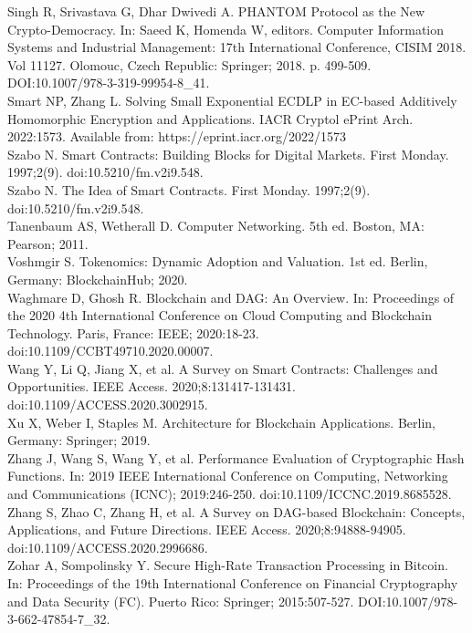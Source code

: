 \documentclass[10pt,a4paper,twocolumn]{article}
\begin{document}
Singh R, Srivastava G, Dhar Dwivedi A. PHANTOM Protocol as the New Crypto-Democracy. In: Saeed K, Homenda W, editors. Computer Information Systems and Industrial Management: 17th International Conference, CISIM 2018. Vol 11127. Olomouc, Czech Republic: Springer; 2018. p. 499-509. DOI:10.1007/978-3-319-99954-8\_41.\\

Smart NP, Zhang L. Solving Small Exponential ECDLP in EC-based Additively Homomorphic Encryption and Applications. IACR Cryptol ePrint Arch. 2022:1573. Available from: https://eprint.iacr.org/2022/1573\\

Szabo N. Smart Contracts: Building Blocks for Digital Markets. First Monday. 1997;2(9). doi:10.5210/fm.v2i9.548.\\

Szabo N. The Idea of Smart Contracts. First Monday. 1997;2(9). doi:10.5210/fm.v2i9.548.\\

Tanenbaum AS, Wetherall D. Computer Networking. 5th ed. Boston, MA: Pearson; 2011.\\

Voshmgir S. Tokenomics: Dynamic Adoption and Valuation. 1st ed. Berlin, Germany: BlockchainHub; 2020.\\

Waghmare D, Ghosh R. Blockchain and DAG: An Overview. In: Proceedings of the 2020 4th International Conference on Cloud Computing and Blockchain Technology. Paris, France: IEEE; 2020:18-23. doi:10.1109/CCBT49710.2020.00007.\\

Wang Y, Li Q, Jiang X, et al. A Survey on Smart Contracts: Challenges and Opportunities. IEEE Access. 2020;8:131417-131431. doi:10.1109/ACCESS.2020.3002915.\\

Xu X, Weber I, Staples M. Architecture for Blockchain Applications. Berlin, Germany: Springer; 2019.\\

Zhang J, Wang S, Wang Y, et al. Performance Evaluation of Cryptographic Hash Functions. In: 2019 IEEE International Conference on Computing, Networking and Communications (ICNC); 2019:246-250. doi:10.1109/ICCNC.2019.8685528.\\

Zhang S, Zhao C, Zhang H, et al. A Survey on DAG-based Blockchain: Concepts, Applications, and Future Directions. IEEE Access. 2020;8:94888-94905. doi:10.1109/ACCESS.2020.2996686.\\

Zohar A, Sompolinsky Y. Secure High-Rate Transaction Processing in Bitcoin. In: Proceedings of the 19th International Conference on Financial Cryptography and Data Security (FC). Puerto Rico: Springer; 2015:507-527. DOI:10.1007/978-3-662-47854-7\_32.\\
\end{document}
